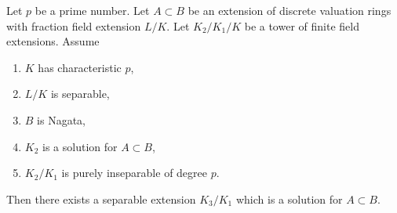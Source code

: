 %
\begin{lemma}
\label{lemma-approximate-solution}
Let $p$ be a prime number. Let $A \subset B$ be an extension of discrete
valuation rings with fraction field extension $L/K$. Let $K_2/K_1/K$ be
a tower of finite field extensions. Assume
\begin{enumerate}
\item $K$ has characteristic $p$,
\item $L/K$ is separable,
\item $B$ is Nagata,
\item $K_2$ is a solution for $A \subset B$,
\item $K_2/K_1$ is purely inseparable of degree $p$.
\end{enumerate}
Then there exists a separable extension $K_3/K_1$
which is a solution for $A \subset B$.
\end{lemma}

